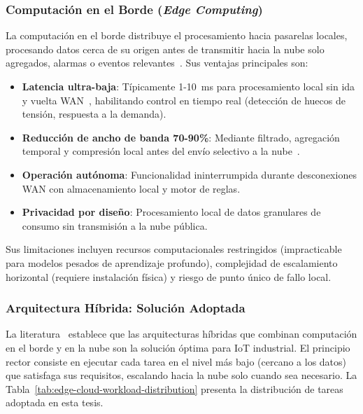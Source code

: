 \subsubsection{Computación en el Borde (\textit{Edge Computing})}

La computación en el borde distribuye el procesamiento hacia pasarelas locales, procesando datos cerca de su origen antes de transmitir hacia la nube solo agregados, alarmas o eventos relevantes~\cite{andriuloEdgeComputingCloud2024,minhEdgeComputingIoTEnabled2022}. Sus ventajas principales son:

\begin{itemize}
\item \textbf{Latencia ultra-baja}: Típicamente 1-10~ms para procesamiento local sin ida y vuelta WAN~\cite{andriuloEdgeComputingCloud2024}, habilitando control en tiempo real (detección de huecos de tensión, respuesta a la demanda).
\item \textbf{Reducción de ancho de banda 70-90\%}: Mediante filtrado, agregación temporal y compresión local antes del envío selectivo a la nube~\cite{andriuloEdgeComputingCloud2024}.
\item \textbf{Operación autónoma}: Funcionalidad ininterrumpida durante desconexiones WAN con almacenamiento local y motor de reglas.
\item \textbf{Privacidad por diseño}: Procesamiento local de datos granulares de consumo sin transmisión a la nube pública.
\end{itemize}

Sus limitaciones incluyen recursos computacionales restringidos (impracticable para modelos pesados de aprendizaje profundo), complejidad de escalamiento horizontal (requiere instalación física) y riesgo de punto único de fallo local.

\subsubsection{Arquitectura Híbrida: Solución Adoptada}

La literatura~\cite{andriuloEdgeComputingCloud2024,bonomiFogComputingItsRole2012} establece que las arquitecturas híbridas que combinan computación en el borde y en la nube son la solución óptima para IoT industrial. El principio rector consiste en ejecutar cada tarea en el nivel más bajo (cercano a los datos) que satisfaga sus requisitos, escalando hacia la nube solo cuando sea necesario. La Tabla~\ref{tab:edge-cloud-workload-distribution} presenta la distribución de tareas adoptada en esta tesis.

